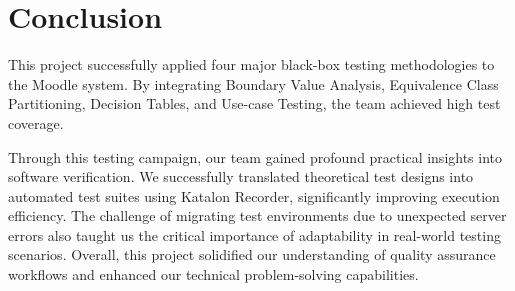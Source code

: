 \documentclass[twoside,final]{hcmut-report}
\begin{document}

\section{Conclusion}
This project successfully applied four major black-box testing methodologies to the Moodle system. By integrating Boundary Value Analysis, Equivalence Class Partitioning, Decision Tables, and Use-case Testing, the team achieved high test coverage. 

Through this testing campaign, our team gained profound practical insights into software verification. We successfully translated theoretical test designs into automated test suites using Katalon Recorder, significantly improving execution efficiency. The challenge of migrating test environments due to unexpected server errors also taught us the critical importance of adaptability in real-world testing scenarios. Overall, this project solidified our understanding of quality assurance workflows and enhanced our technical problem-solving capabilities.
\end{document}

